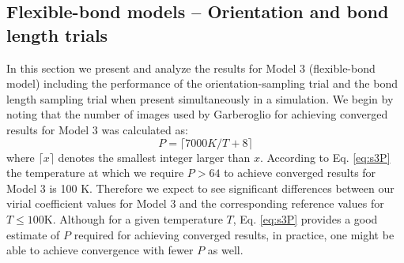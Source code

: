         \subsection{Flexible-bond models -- Orientation and bond length trials}
            In this section we present and analyze the results for Model 3 (flexible-bond model) including the performance of the orientation-sampling trial and the bond length sampling trial when present simultaneously in a simulation. We begin by noting that the number of images used by Garberoglio for achieving converged results \cite{Garberoglio2014} for Model 3 was calculated as:
            \begin{equation}
            \label{eq:s3P}
                P = \lceil 7000 K/T + 8 \rceil
            \end{equation}
            where $\lceil x \rceil$ denotes the smallest integer larger than $x$.
According to Eq. \eqref{eq:s3P} the temperature at which we require $P > 64$ to achieve converged results for Model 3 is 100 K. Therefore we expect to see significant differences between our virial coefficient values for Model 3 and the corresponding reference values for $T \le 100 $K. Although for a given temperature $T$, Eq. \eqref{eq:s3P} provides a good estimate of $P$ required for achieving converged results, in practice, one might be able to achieve convergence with fewer $P$ as well.

